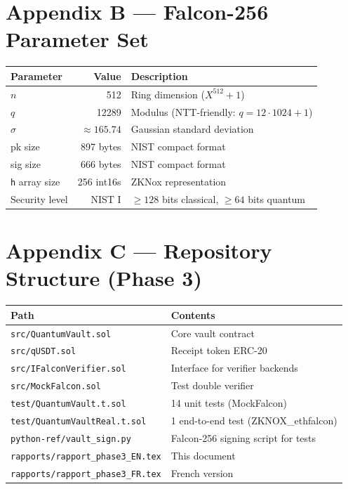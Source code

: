 \documentclass[11pt,a4paper]{article}
\begin{document}
\section{Appendix B --- Falcon-256 Parameter Set}

\begin{center}
\begin{tabular}{lrl}
\toprule
\textbf{Parameter} & \textbf{Value} & \textbf{Description} \\
\midrule
$n$ & 512 & Ring dimension ($X^{512} + 1$) \\
$q$ & 12289 & Modulus (NTT-friendly: $q = 12 \cdot 1024 + 1$) \\
$\sigma$ & $\approx 165.74$ & Gaussian standard deviation \\
pk size & 897 bytes & NIST compact format \\
sig size & 666 bytes & NIST compact format \\
\texttt{h} array size & 256 int16s & ZKNox representation \\
Security level & NIST I & $\geq 128$ bits classical, $\geq 64$ bits quantum \\
\bottomrule
\end{tabular}
\end{center}

\section{Appendix C --- Repository Structure (Phase 3)}

\begin{center}
\begin{tabular}{ll}
\toprule
\textbf{Path} & \textbf{Contents} \\
\midrule
\texttt{src/QuantumVault.sol} & Core vault contract \\
\texttt{src/qUSDT.sol} & Receipt token ERC-20 \\
\texttt{src/IFalconVerifier.sol} & Interface for verifier backends \\
\texttt{src/MockFalcon.sol} & Test double verifier \\
\texttt{test/QuantumVault.t.sol} & 14 unit tests (MockFalcon) \\
\texttt{test/QuantumVaultReal.t.sol} & 1 end-to-end test (ZKNOX\_ethfalcon) \\
\texttt{python-ref/vault\_sign.py} & Falcon-256 signing script for tests \\
\texttt{rapports/rapport\_phase3\_EN.tex} & This document \\
\texttt{rapports/rapport\_phase3\_FR.tex} & French version \\
\bottomrule
\end{tabular}
\end{center}

\end{document}
